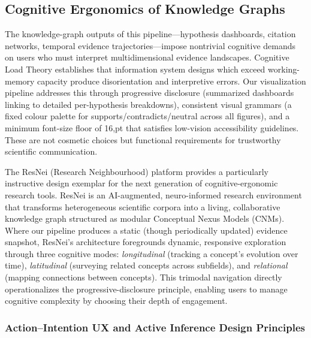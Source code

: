 \documentclass[
  english,
]{article}
\begin{document}
\subsection{Cognitive Ergonomics of Knowledge
Graphs}\label{cognitive-ergonomics-of-knowledge-graphs}

The knowledge-graph outputs of this pipeline---hypothesis dashboards,
citation networks, temporal evidence trajectories---impose nontrivial
cognitive demands on users who must interpret multidimensional evidence
landscapes. Cognitive Load Theory \citep{sweller2011cognitive}
establishes that information system designs which exceed working-memory
capacity produce disorientation and interpretive errors. Our
visualization pipeline addresses this through progressive disclosure
(summarized dashboards linking to detailed per-hypothesis breakdowns),
consistent visual grammars (a fixed colour palette for
supports/contradicts/neutral across all figures), and a minimum
font-size floor of 16,pt that satisfies low-vision accessibility
guidelines. These are not cosmetic choices but functional requirements
for trustworthy scientific communication.

The ResNei (Research Neighbourhood) platform \citep{lumiruusu2025resnei}
provides a particularly instructive design exemplar for the next
generation of cognitive-ergonomic research tools. ResNei is an
AI-augmented, neuro-informed research environment that transforms
heterogeneous scientific corpora into a living, collaborative knowledge
graph structured as modular Conceptual Nexus Models (CNMs). Where our
pipeline produces a static (though periodically updated) evidence
snapshot, ResNei's architecture foregrounds dynamic, responsive
exploration through three cognitive modes: \textit{longitudinal}
(tracking a concept's evolution over time), \textit{latitudinal}
(surveying related concepts across subfields), and \textit{relational}
(mapping connections between concepts). This trimodal navigation
directly operationalizes the progressive-disclosure principle, enabling
users to manage cognitive complexity by choosing their depth of
engagement.

\subsubsection{Action--Intention UX and Active Inference Design
Principles}\label{actionintention-ux-and-active-inference-design-principles}
\end{document}
